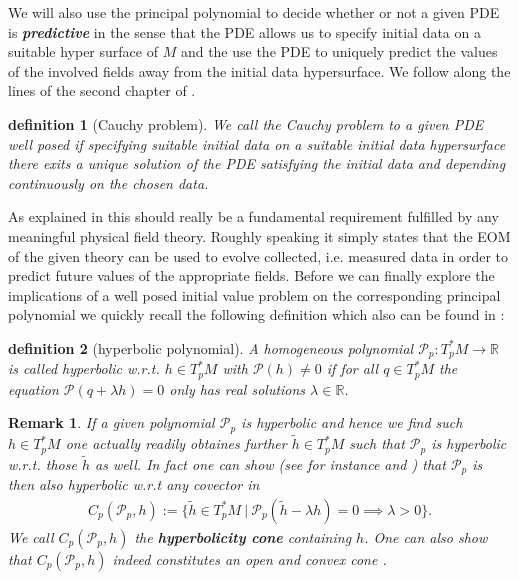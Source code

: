 \documentclass[a4paper,12pt, DIV=14, BCOR=5mm, twoside, headsepline]{scrbook}
\newtheorem{definition}{definition}[section]
\newtheorem*{remark}{Remark}
\begin{document}
We will also use the principal polynomial to decide whether or not a given PDE is \textit{\textbf{predictive}} in the sense that the PDE allows us to specify initial data on a suitable hyper surface of $M$ and the use the PDE to uniquely predict the values of the involved fields away from the initial data hypersurface. We follow along the lines of the second chapter of \cite{Rivera}.
\begin{definition}[Cauchy problem]
We call the Cauchy problem to a given PDE well posed if specifying suitable initial data on a suitable initial data hypersurface there exits a unique solution of the PDE satisfying the initial data and depending continuously on the chosen data.  
\end{definition}
As explained in \cite{Rivera} this should really be a fundamental requirement fulfilled by any meaningful physical field theory. Roughly speaking it simply states that the EOM of the given theory can be used to evolve collected, i.e. measured data in order to predict future values of the appropriate fields.
Before we can finally explore the implications of a well posed initial value problem on the corresponding principal polynomial we quickly recall the following definition which also can be found in \cite{Rivera}:
\begin{definition}[hyperbolic polynomial]
A homogeneous polynomial $\mathcal{P}_p : T_p^{\ast}M \rightarrow \mathbb{R}$ is called hyperbolic w.r.t. $h\in T_p^{\ast}M$ with $\mathcal{P}(h) \neq 0$ if for all $q\in T_p^{\ast}M$ the equation $\mathcal{P}(q + \lambda h)=0$ only has real solutions $\lambda \in \mathbb{R}$.
\end{definition}
\begin{remark}
If a given polynomial $\mathcal{P}_p$ is hyperbolic and hence we find such $h\in T^{\ast}_pM$ one actually readily obtaines further $\tilde{h}\in T^{\ast}_pM$ such that $\mathcal{P}_p$ is hyperbolic w.r.t. those $\tilde{h}$ as well. In fact one can show (see for instance \cite{Rivera} and \cite{10.2307/24900665}) that $\mathcal{P}_p$ is then also hyperbolic w.r.t any covector in 
\begin{align}
    C_p(\mathcal{P}_p,h) := \{ \tilde{h} \in T_p^{\ast}M \ \vert \ \mathcal{P}_p(\tilde{h}- \lambda h) = 0 \implies \lambda > 0\}.
\end{align}
We call $C_p(\mathcal{P}_p,h)$ the \textbf{\textit{hyperbolicity cone}} containing $h$. One can also show that $C_p(\mathcal{P}_p,h)$ indeed constitutes an open and convex cone \cite{10.2307/24900665}.
\end{remark}
\end{document}
